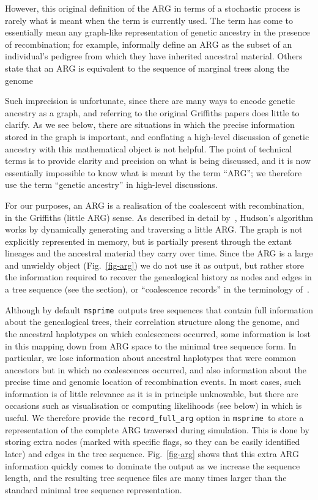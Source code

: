 \documentclass{article}
\newcommand{\msprime}[0]{\texttt{msprime}}
\begin{document}
However, this original definition of the ARG in terms of a stochastic process
is rarely what is meant when the term is currently used. The term has come to
essentially mean any graph-like representation of genetic ancestry in the presence
of recombination; for example,
\cite{mathieson2020ancestry} informally define an ARG as the subset of an
individual's pedigree from which they have inherited ancestral material.
Others state that an ARG is equivalent to the sequence of marginal
trees along the genome~\citep{yang2016rapidly,mirzaei2016rent}

Such
imprecision is unfortunate, since there are many ways to encode genetic
ancestry as a graph, and referring to the original Griffiths papers does little to
clarify. As we see below, there are situations in which the precise information
stored in the graph is important, and conflating a high-level
discussion of genetic ancestry with this mathematical object is not
helpful. The point of technical terms is to provide clarity and
precision on what is being discussed, and it is now essentially
impossible to know what is meant by the term ``ARG'';
we therefore use the term ``genetic ancestry'' in high-level
discussions.

For our purposes, an ARG is a realisation of the coalescent with
recombination, in the Griffiths (little ARG) sense.
As described in detail by~\cite{kelleher2016efficient}, Hudson's algorithm
works by dynamically generating and traversing a little ARG.
The graph is not explicitly represented in memory, but is partially
present through the extant lineages and the ancestral material they carry
over time. Since the ARG is a large and unwieldy object
(Fig.~\ref{fig-arg}) we do not use it as output, but
rather store the information required to recover the genealogical
history as nodes and edges in a tree sequence (see the  section),
or ``coalescence records'' in the terminology of~\citep{kelleher2016efficient}.

Although by default \msprime\ outputs tree sequences that contain full information
about the genealogical trees, their correlation structure along the genome,
and the ancestral haplotypes on which coalescences occurred, some information
is lost in this mapping down from ARG space to the minimal tree sequence
form. In particular, we lose
information about ancestral haplotypes that were common ancestors but
in which no coalescences occurred, and also information about the precise time
and genomic location of recombination events. In most cases, such
information is of little relevance as it is in principle unknowable,
but there are occasions such as visualisation or computing likelihoods (see
below) in which is useful. We therefore provide
the \texttt{record\_full\_arg} option in \msprime\
to store a representation of the complete ARG traversed during simulation.
This is done by storing extra nodes (marked with specific flags, so they
can be easily identified later) and edges in the tree sequence.
Fig.~\ref{fig-arg} shows that this extra ARG information
quickly comes to dominate the output as we increase the sequence length,
and the resulting tree sequence files are many times larger
than the standard minimal tree sequence representation.
\end{document}
